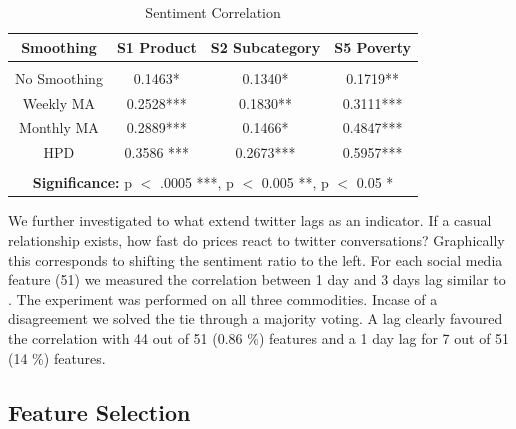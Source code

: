 \begin{table}[h]   
\centering
 \begin{tabular}{  c  | c  | c | c }
			
    \textbf{Smoothing}  & \textbf{S1 Product} & \textbf{S2 Subcategory} &\textbf{S5 Poverty} \\
  \hline 
  &&& \\
  No Smoothing & 0.1463*  &   0.1340* &    0.1719**  \\
  
  Weekly MA &    0.2528***   & 0.1830** &   0.3111***\\

  Monthly MA &  0.2889***  & 0.1466* & 0.4847*** \\

  HPD &  0.3586 ***  &  0.2673*** &   0.5957***  \\
  

\hline 

\multicolumn{4}{c}{\null}\\

\multicolumn{4}{c}{\textbf{Significance:} p $<$ .0005 ***, p $<$ 0.005 **, p $<$ 0.05 *}\\
\hline  

\end{tabular}
\caption{Sentiment Correlation}
\label{tab:smoothing_corr}


\end{table}


We further investigated to what extend twitter lags as an indicator. If a casual relationship exists, how fast do prices react to twitter conversations? Graphically this corresponds to shifting the sentiment ratio to the left. For each social media feature (51) we measured the correlation between 1 day and 3 days lag similar to \cite{Si_exploitingtopic}. The experiment was performed on all three commodities. Incase of a disagreement we solved  the tie through a majority voting. A 
 lag clearly favoured the correlation with 44 out of 51 (0.86 \%) features and a 1 day lag for 7 out of 51 (14 \%) features. 


\subsection{Feature Selection}

